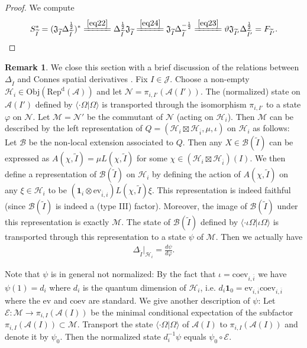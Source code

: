 \documentclass[12pt,a4paper]{article}
\theoremstyle{definition}
\newtheorem{rem}[df]{Remark}
\theoremstyle{plain}
\newcommand{\fk}{\mathfrak}
\newcommand{\mc}{\mathcal}
\newcommand{\wtd}{\widetilde}
\newcommand{\ovl}{\overline}
\newcommand{\id}{\mathbf{1}}
\newcommand{\ev}{\mathrm{ev}}
\newcommand{\coev}{\mathrm{coev}}
\newcommand{\bk}[1]{\langle {#1}\rangle}
\newcommand{\RepdA}{\mathrm{Rep}^{\mathrm d}(\mc A)}
\newcommand{\Obj}{\mathrm{Obj}}
\numberwithin{equation}{section}
\begin{document}
\begin{proof}
We compute
\begin{align*}
S_{\wtd I}^*=(\fk J_{\wtd I}\Delta_{\wtd I}^{\frac 12})^*\xlongequal{\eqref{eq22}}\Delta_{\wtd I}^{\frac 12}\fk J_{\wtd I}\xlongequal{\eqref{eq24}} \fk J_{\wtd I}\Delta_{\wtd I}^{-\frac 12}\xlongequal{\eqref{eq23}}\vartheta\fk J_{\wtd I'}\Delta_{\wtd I'}^{\frac 12}=F_{\wtd I'}.
\end{align*}
\end{proof}








\begin{rem}\label{lb24}
We close this section with a brief discussion of the relations between $\Delta_{\wtd I}$ and Connes spatial derivatives \cite{Con80}. Fix $I\in\mc J$. Choose a non-empty $\mc H_i\in\Obj(\RepdA)$ and let $\mc N=\pi_{i,I'}(\mc A(I'))$. The (normalized) state on $\mc A(I')$ defined by $\bk{\cdot\Omega|\Omega}$ is transported through the isomorphism $\pi_{i,I'}$ to a state $\varphi$ on $\mc N$. Let $\mc M=\mc N'$ be the commutant of $\mc N$ (acting on $\mc H_i$). Then $\mc M$ can be described by the left representation of $Q=(\mc H_i\boxtimes\mc H_{\ovl i},\mu,\iota)$ on $\mc H_i$ as follows: Let $\mc B$ be the non-local extension associated to $Q$. Then any $X\in\mc B(\wtd I)$ can be expressed as $A(\chi,\wtd I)=\mu L(\chi,\wtd I)$ for some $\chi\in(\mc H_i\boxtimes\mc H_{\ovl i})(I)$. We then define a representation of $\mc B(\wtd I)$ on $\mc H_i$ by defining the action of $A(\chi,\wtd I)$ on any $\xi\in\mc H_i$ to be $(\id_i\otimes\ev_{\ovl i,i})L(\chi,\wtd I)\xi$. This representation is indeed faithful (since $\mc B(\wtd I)$ is indeed a (type III) factor). Moreover, the image of $\mc B(\wtd I)$ under this representation is exactly $\mc M$. The state of $\mc B(\wtd I)$ defined by $\bk{\cdot\iota\Omega|\iota\Omega}$ is transported through this representation to a state $\psi$ of $\mc M$. Then we actually have
\begin{align}
\Delta_{\wtd I}|_{\mc H_i}=\frac{d\psi}{d\varphi}.
\end{align}

Note that $\psi$ is in general not normalized: By the fact that $\iota=\coev_{i,\ovl i}$ we have $\psi(1)=d_i$ where $d_i$ is the quantum dimension of $\mc H_i$, i.e. $d_i\id_0=\ev_{i,\ovl i}\coev_{i,\ovl i}$ where the $\ev$ and $\coev$ are standard. We give another description of $\psi$: Let $\mc E:\mc M\rightarrow\pi_{i,I}(\mc A(I))$ be the minimal conditional expectation of the subfactor $\pi_{i,I}(\mc A(I))\subset\mc M$. Transport the state $\bk{\cdot\Omega|\Omega}$ of $\mc A(I)$ to $\pi_{i,I}(\mc A(I))$ and denote it by $\psi_0$. Then the normalized state $d_i^{-1}\psi$ equals $\psi_0\circ\mc E$.
\end{rem}
\end{document}

